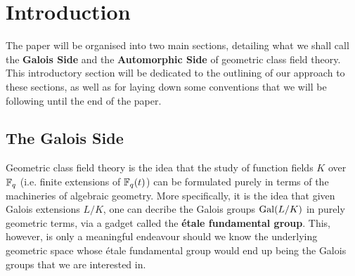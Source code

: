 \section{Introduction}
    The paper will be organised into two main sections, detailing what we shall call the \textbf{Galois Side} and the \textbf{Automorphic Side} of geometric class field theory. This introductory section will be dedicated to the outlining of our approach to these sections, as well as for laying down some conventions that we will be following until the end of the paper.

    \subsection{The Galois Side}
        Geometric class field theory is the idea that the study of function fields $K$ over $\mathbb{F}_q$ (i.e. finite extensions of $\mathbb{F}_q(t)$) can be formulated purely in terms of the machineries of algebraic geometry. More specifically, it is the idea that given Galois extensions $L/K$, one can decribe the Galois groups $\mathrm{Gal}(L/K)$ in purely geometric terms, via a gadget called the \textbf{\'etale fundamental group}. This, however, is only a meaningful endeavour should we know the underlying geometric space whose \'etale fundamental group would end up being the Galois groups that we are interested in.
        
